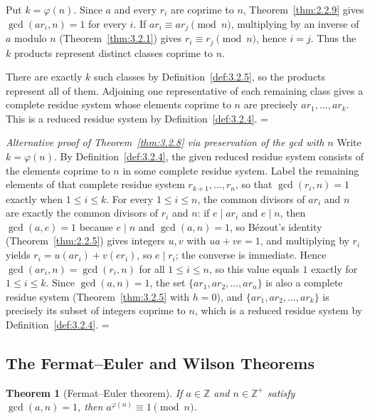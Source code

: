 \documentclass[11pt]{article}
\makeatletter
\theoremstyle{ntstyle}
\newtheorem{theorem}{Theorem}[subsection]
\let\nt@closedisplay\]
\def\nt@guardedclose{\@ifnextchar\par{\nt@closeafterpar}{\@ifnextchar\end{\postdisplaypenalty\@M\nt@closedisplay}{\nt@closedisplay}}}
\def\nt@closeafterpar\par{\@ifnextchar\par{\nt@closeafterpar}{\@ifnextchar\end{\postdisplaypenalty\@M\nt@closedisplay\par}{\nt@closedisplay\par}}}
\renewenvironment{proof}[1][\proofname]{\par
  \pushQED{\qed}\normalfont\topsep\medskipamount\edef\nt@afterproof{\@endparpenalty=\the\@endparpenalty\relax}\@beginparpenalty\@M\@endparpenalty\@M\let\]\nt@guardedclose\trivlist\item[]\textit{#1\@addpunct{.}} \ignorespaces}{\ifvmode\addpenalty\@M\fi\popQED\nt@afterproof\endtrivlist\@endpefalse}
\newenvironment{altproof}[1][\proofname]{\begin{proof}[#1]}{\end{proof}}
\makeatother
\begin{document}
\begin{proof}
Put $k=\varphi(n)$. Since $a$ and every $r_i$ are coprime to $n$,
		Theorem~\ref{thm:2.2.9} gives $\gcd(ar_i,n)=1$ for every $i$.
		If $ar_i\equiv ar_j\pmod{n}$, multiplying by an inverse of $a$ modulo $n$
		(Theorem~\ref{thm:3.2.1}) gives $r_i\equiv r_j\pmod{n}$, hence $i=j$. Thus the $k$ products represent
		distinct classes coprime to $n$.

		There are exactly $k$ such classes by Definition~\ref{def:3.2.5}, so
		the products represent all of them. Adjoining one representative
		of each remaining class gives a complete residue system whose
		elements coprime to $n$ are precisely $ar_1,\ldots,ar_k$.
		This is a reduced residue system by Definition~\ref{def:3.2.4}.
\end{proof}
\begin{altproof}[Alternative proof of Theorem~\ref{thm:3.2.8} via preservation of the gcd with $n$]
Write $k=\varphi(n)$. By Definition~\ref{def:3.2.4}, the
	given reduced residue system consists of the elements coprime to $n$
	in some complete residue system. Label the remaining elements of that complete residue system
	$r_{k+1},\ldots,r_n$, so that $\gcd(r_i,n)=1$ exactly when $1\le i\le k$. For every $1 \le i \le n$, the common
	divisors of $ar_i$ and $n$ are exactly the common divisors of $r_i$
	and $n$: if $e\mid ar_i$ and $e\mid n$, then $\gcd(a, e)=1$ because
	$e\mid n$ and $\gcd(a, n)=1$, so B{\'e}zout's identity (Theorem~\ref{thm:2.2.5})
	gives integers $u,v$ with
	$ua+ve=1$, and multiplying by $r_i$ yields $r_i=u(ar_i)+v(er_i)$, so
	$e\mid r_i$; the converse is immediate. Hence $\gcd(ar_i, n) =
		\gcd(r_i, n)$ for all $1 \le i \le n$, so this value equals $1$
	exactly for $1 \le i \le k$. Since $\gcd(a, n)=1$, the set $\{a
		r_1, a r_2, \ldots, a r_n\}$ is also a complete residue system
	(Theorem~\ref{thm:3.2.5} with $h = 0$), and $\{a r_1, a r_2, \ldots, a r_k\}$ is
	precisely
	its subset of integers coprime to $n$, which is a reduced residue
	system by Definition~\ref{def:3.2.4}.
\end{altproof}
\subsection{The Fermat--Euler and Wilson Theorems}

\begin{theorem}[Fermat--Euler theorem]\label{thm:3.3.1} If $a \in \mathbb{Z}$
	and $n \in \mathbb{Z}^+$ satisfy $\gcd(a, n)=1$, then $a^{\varphi(n)} \equiv
		1 \pmod{n}$.
\end{theorem}
\end{document}
